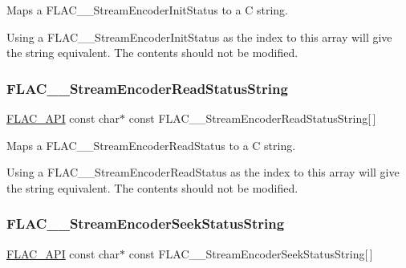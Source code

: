 Maps a F\+L\+A\+C\+\_\+\+\_\+\+Stream\+Encoder\+Init\+Status to a C string.

Using a F\+L\+A\+C\+\_\+\+\_\+\+Stream\+Encoder\+Init\+Status as the index to this array will give the string equivalent. The contents should not be modified. \mbox{\label{group__flac__stream__encoder_ga056c12d2a27c562d352eb575d4cb9086}} 
\subsubsection{\texorpdfstring{FLAC\_\_StreamEncoderReadStatusString}{FLAC\_\_StreamEncoderReadStatusString}}
{\footnotesize\ttfamily \mbox{\hyperlink{group__flac__export_ga56ca07df8a23310707732b1c0007d6f5}{F\+L\+A\+C\+\_\+\+A\+PI}} const char$\ast$ const F\+L\+A\+C\+\_\+\+\_\+\+Stream\+Encoder\+Read\+Status\+String\mbox{[}$\,$\mbox{]}}

Maps a F\+L\+A\+C\+\_\+\+\_\+\+Stream\+Encoder\+Read\+Status to a C string.

Using a F\+L\+A\+C\+\_\+\+\_\+\+Stream\+Encoder\+Read\+Status as the index to this array will give the string equivalent. The contents should not be modified. \mbox{\label{group__flac__stream__encoder_gaf38671371a395919b6baee141ad90642}} 
\subsubsection{\texorpdfstring{FLAC\_\_StreamEncoderSeekStatusString}{FLAC\_\_StreamEncoderSeekStatusString}}
{\footnotesize\ttfamily \mbox{\hyperlink{group__flac__export_ga56ca07df8a23310707732b1c0007d6f5}{F\+L\+A\+C\+\_\+\+A\+PI}} const char$\ast$ const F\+L\+A\+C\+\_\+\+\_\+\+Stream\+Encoder\+Seek\+Status\+String\mbox{[}$\,$\mbox{]}}

